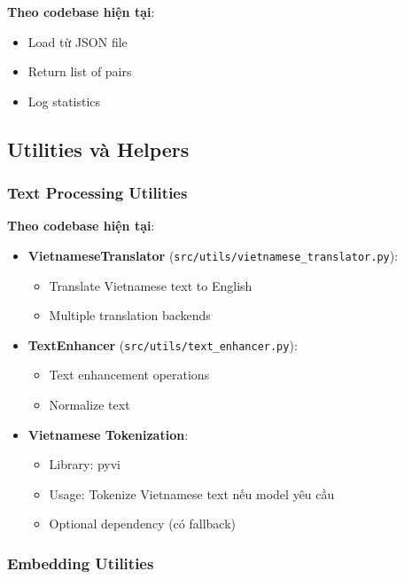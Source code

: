 \textbf{Theo codebase hiện tại}:

\begin{itemize}
    \item Load từ JSON file
    \item Return list of pairs
    \item Log statistics
\end{itemize}

\subsection{Utilities và Helpers}

\subsubsection{Text Processing Utilities}

\textbf{Theo codebase hiện tại}:

\begin{itemize}
    \item \textbf{VietnameseTranslator} (\texttt{src/utils/vietnamese\_translator.py}):
    \begin{itemize}
        \item Translate Vietnamese text to English
        \item Multiple translation backends
    \end{itemize}
    
    \item \textbf{TextEnhancer} (\texttt{src/utils/text\_enhancer.py}):
    \begin{itemize}
        \item Text enhancement operations
        \item Normalize text
    \end{itemize}
    
    \item \textbf{Vietnamese Tokenization}:
    \begin{itemize}
        \item Library: pyvi
        \item Usage: Tokenize Vietnamese text nếu model yêu cầu
        \item Optional dependency (có fallback)
    \end{itemize}
\end{itemize}

\subsubsection{Embedding Utilities}

